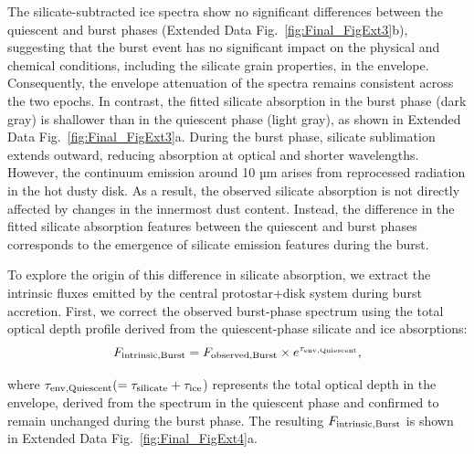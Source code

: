 \documentclass[pdflatex,sn-mathphys-num]{sn-jnl}
\theoremstyle{thmstyleone}
\theoremstyle{thmstyletwo}
\theoremstyle{thmstylethree}
\begin{document}
\begin{bibunit}
The silicate-subtracted ice spectra show no significant differences between the quiescent and burst phases (Extended Data Fig.~\ref{fig:Final_FigExt3}b), suggesting that the burst event has no significant impact on the physical and chemical conditions, including the silicate grain properties, in the envelope. Consequently, the envelope attenuation of the spectra remains consistent across the two epochs.
In contrast, the fitted silicate absorption in the burst phase (dark gray) is shallower than in the quiescent phase (light gray), as shown in  Extended Data Fig.~\ref{fig:Final_FigExt3}a.
During the burst phase, silicate sublimation extends outward, reducing absorption at optical and shorter wavelengths. However, the continuum emission around 10 µm arises from reprocessed radiation in the hot dusty disk. As a result, the observed silicate absorption is not directly affected by changes in the innermost dust content.
Instead, the difference in the fitted silicate absorption features between the quiescent and burst phases corresponds to the emergence of silicate emission features during the burst.

To explore the origin of this difference in silicate absorption, we extract the intrinsic fluxes emitted by the central protostar+disk system during burst accretion.
First, we correct the observed burst-phase spectrum using the total optical depth profile derived from the quiescent-phase silicate and ice absorptions:
\begin{equation*}
F_{\rm intrinsic, Burst}=F_{\rm observed, Burst} \times e^{\tau_{\rm env, Quiescent}},
\end{equation*}

\noindent where $\tau_{\rm env, Quiescent} (= \tau_{\rm silicate} + \tau_{\rm ice}$) represents the total optical depth in the envelope, derived from the spectrum in the quiescent phase and confirmed to remain unchanged during the burst phase.
The resulting $F_{\rm intrinsic, Burst}$ is shown in Extended Data Fig.~\ref{fig:Final_FigExt4}a.


\end{bibunit}
\end{document}
